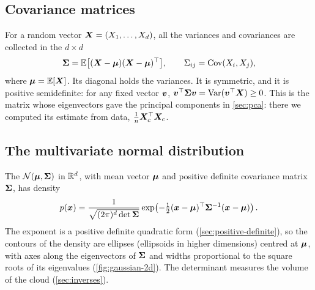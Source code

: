 \subsection{Covariance matrices}

For a random vector $\bm{X} = (X_1, \dots, X_d)$, all the variances and covariances
are collected in the $d\times d$ 
\[
  \bm{\Sigma} = \mathbb{E}\bigl[(\bm{X} - \bm{\mu})(\bm{X} - \bm{\mu})^\top\bigr],
  \qquad \Sigma_{ij} = \operatorname{Cov}(X_i, X_j),
\]
where $\bm{\mu} = \mathbb{E}[\bm{X}]$. Its diagonal holds the variances. It is symmetric, and it
is positive semidefinite: for any fixed vector $\bm{v}$,
$\bm{v}^\top\bm{\Sigma}\bm{v} = \operatorname{Var}(\bm{v}^\top\bm{X}) \ge 0$. This is the matrix whose eigenvectors
gave the principal components in \cref{sec:pca}: there we computed its estimate
from data, $\frac1n\bm{X}_c^\top\bm{X}_c$.

\subsection{The multivariate normal distribution}

The  $\mathcal{N}(\bm{\mu}, \bm{\Sigma})$ in $\mathbb{R}^d$,
with mean vector $\bm{\mu}$ and positive definite covariance matrix $\bm{\Sigma}$, has
density
\[
  p(\bm{x}) = \frac{1}{\sqrt{(2\pi)^d\det\bm{\Sigma}}}
  \exp\!\left(-\tfrac12(\bm{x} - \bm{\mu})^\top\bm{\Sigma}^{-1}(\bm{x} - \bm{\mu})\right).
\]
The exponent is a positive definite quadratic form (\cref{sec:positive-definite}),
so the contours of the density are ellipses (ellipsoids in higher dimensions)
centred at $\bm{\mu}$, with axes along the eigenvectors of $\bm{\Sigma}$ and widths
proportional to the square roots of its eigenvalues (\cref{fig:gaussian-2d}). The
determinant measures the volume of the cloud (\cref{sec:inverses}).

